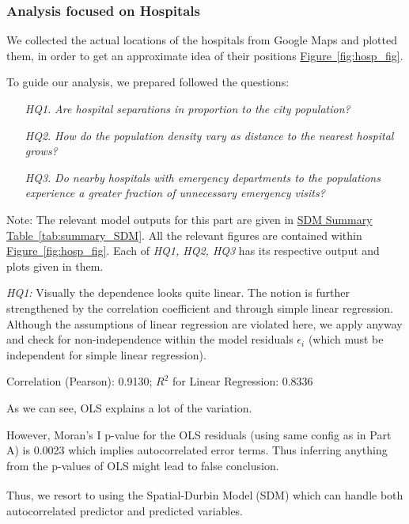 \documentclass[
	a4paper, %
	10pt, %
	unnumberedsections, %
	twoside, %
]{LTJournalArticle}
\begin{document}
\subsubsection{Analysis focused on Hospitals}

We collected the actual locations of the hospitals from Google Maps and plotted them, in order to get an approximate idea of their positions \hyperref[fig:hosp_fig]{Figure~\ref{fig:hosp_fig}}.

To guide our analysis, we prepared followed the questions:
\begin{enumerate}
  \item[\textit{HQ1.}] \textit{Are hospital separations in proportion to the city population?}
  \item[\textit{HQ2.}] \textit{How do the population density vary as distance to the nearest hospital grows?}
  \item[\textit{HQ3.}] \textit{Do nearby hospitals with emergency departments to the populations experience a greater fraction of unnecessary emergency visits?}
\end{enumerate}

Note: The relevant model outputs for this part are given in \hyperref[tab:summary_SDM]{SDM Summary Table~\ref{tab:summary_SDM}}. All the relevant figures are contained within \hyperref[fig:hosp_fig]{Figure~\ref{fig:hosp_fig}}. Each of \textit{HQ1, HQ2, HQ3} has its respective output and plots given in them.



\textit{HQ1:} Visually the dependence looks quite linear. The notion is further strengthened by the correlation coefficient and through simple linear regression. Although the assumptions of linear regression are violated here, we apply anyway and check for non-independence within the model residuals $\epsilon_i$ (which must be independent for simple linear regression). 

Correlation (Pearson): 0.9130; $R^2$ for Linear Regression: 0.8336

As we can see, OLS explains a lot of the variation. 

However, Moran's I p-value for the OLS residuals (using same config as in Part A) is 0.0023 which implies autocorrelated error terms. Thus inferring anything from the p-values of OLS might lead to false conclusion.

Thus, we resort to using the Spatial-Durbin Model\textsuperscript{\cite{atikah2021efficiency} \cite{Anselin1988} \cite{doi:10.1080/17421770601009841}} (SDM) which can handle both autocorrelated predictor and predicted variables.
\end{document}
